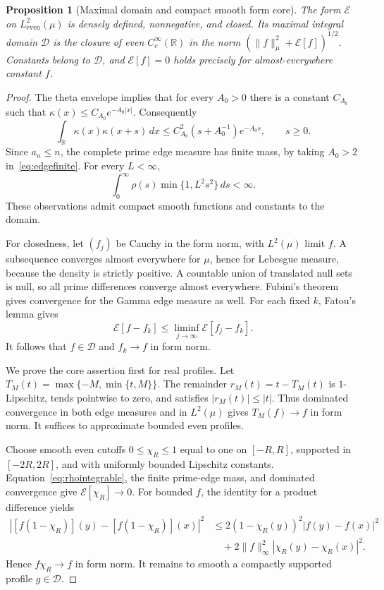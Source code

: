\documentclass[11pt,a4paper]{article}
\numberwithin{equation}{section}
\newtheorem{proposition}[theorem]{Proposition}
\theoremstyle{remark}
\newcommand{\R}{\mathbb R}
\newcommand{\E}{\mathcal E}
\newcommand{\D}{\mathcal D}
\newcommand{\He}{L^2_{\mathrm{even}}(\mu)}
\newcommand{\norm}[1]{\lVert #1\rVert}
\begin{document}
\begin{proposition}[Maximal domain and compact smooth form core]\label{prop:core}
The form $\E$ on $\He$ is densely defined, nonnegative, and closed. Its maximal integral domain $\D$ is the closure of even $C_c^\infty(\R)$ in the norm $(\norm{f}_\mu^2+\E[f])^{1/2}$. Constants belong to $\D$, and $\E[f]=0$ holds precisely for almost-everywhere constant $f$.
\end{proposition}
\begin{proof}
The theta envelope implies that for every $A_0>0$ there is a constant $C_{A_0}$ such that $\kappa(x)\le C_{A_0}e^{-A_0|x|}$. Consequently
\begin{equation}\label{eq:edgefinite}
 \int_\R\kappa(x)\kappa(x+s)\,dx
 \le C_{A_0}^2(s+A_0^{-1})e^{-A_0s},\qquad s\ge0.
\end{equation}
Since $a_n\le n$, the complete prime edge measure has finite mass, by taking $A_0>2$ in~\eqref{eq:edgefinite}. For every $L<\infty$,
\begin{equation}\label{eq:rhointegrable}
 \int_0^\infty\rho(s)\min\{1,L^2s^2\}\,ds<\infty.
\end{equation}
These observations admit compact smooth functions and constants to the domain.

For closedness, let $(f_j)$ be Cauchy in the form norm, with $L^2(\mu)$ limit $f$. A subsequence converges almost everywhere for $\mu$, hence for Lebesgue measure, because the density is strictly positive. A countable union of translated null sets is null, so all prime differences converge almost everywhere. Fubini's theorem gives convergence for the Gamma edge measure as well. For each fixed $k$, Fatou's lemma gives
\[
 \E[f-f_k]\le\liminf_{j\to\infty}\E[f_j-f_k].
\]
It follows that $f\in\D$ and $f_k\to f$ in form norm.

We prove the core assertion first for real profiles. Let $T_M(t)=\max\{-M,\min\{t,M\}\}$. The remainder $r_M(t)=t-T_M(t)$ is $1$-Lipschitz, tends pointwise to zero, and satisfies $|r_M(t)|\le|t|$. Thus dominated convergence in both edge measures and in $L^2(\mu)$ gives $T_M(f)\to f$ in form norm. It suffices to approximate bounded even profiles.

Choose smooth even cutoffs $0\le\chi_R\le1$ equal to one on $[-R,R]$, supported in $[-2R,2R]$, and with uniformly bounded Lipschitz constants. Equation~\eqref{eq:rhointegrable}, the finite prime-edge mass, and dominated convergence give $\E[\chi_R]\to0$. For bounded $f$, the identity for a product difference yields
\begin{align*}
 |[f(1-\chi_R)](y)-[f(1-\chi_R)](x)|^2
 &\le2(1-\chi_R(y))^2|f(y)-f(x)|^2\\
 &\quad+2\norm{f}_\infty^2|\chi_R(y)-\chi_R(x)|^2.
\end{align*}
Hence $f\chi_R\to f$ in form norm. It remains to smooth a compactly supported profile $g\in\D$.


\end{proof}
\end{document}
